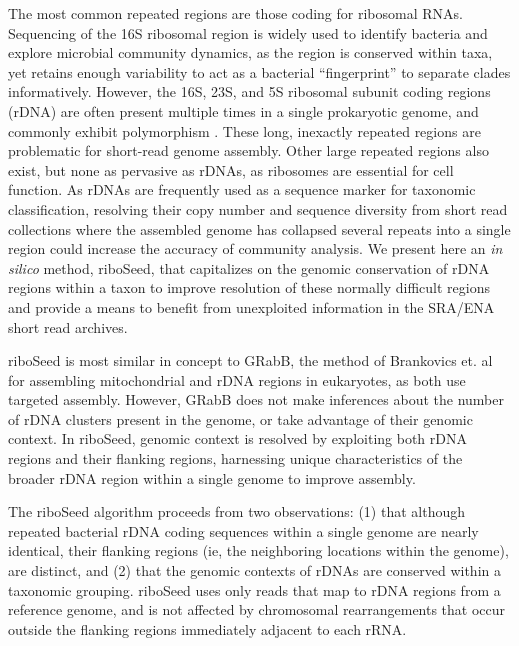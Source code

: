\documentclass[10pt]{article}
\begin{document}
\begin{linenumbers}
The most common repeated regions are those coding for ribosomal RNAs. Sequencing of the 16S ribosomal region is widely used to identify bacteria and explore microbial community dynamics\cite{Weisburg1991,Clarridge2004,Woese1990,Case2007}, as the region is conserved within taxa, yet retains enough variability to act as a bacterial ``fingerprint'' to separate clades informatively. However, the 16S, 23S, and 5S ribosomal subunit coding regions (rDNA) are often present multiple times in a single prokaryotic genome, and commonly exhibit polymorphism \cite{Coenye2003,Moreno2002,Lukjancenko2010,Vetrovsky2013}. These long, inexactly repeated regions\cite{Alkan2011} are problematic for short-read genome assembly. Other large repeated regions also exist, but none as pervasive as rDNAs, as ribosomes are essential for cell function. As rDNAs are frequently used as a sequence marker for taxonomic classification, resolving their copy number and sequence diversity from short read collections where the assembled genome has collapsed several repeats into a single region could increase the accuracy of community analysis. We present here an \textit{in silico} method, riboSeed, that capitalizes on the genomic conservation of rDNA regions within a taxon to improve resolution of these normally difficult regions and provide a means to benefit from unexploited information in the SRA/ENA short read archives.


riboSeed is most similar in concept to GRabB, the method of Brankovics et. al \cite{Brankovics2016} for assembling mitochondrial and rDNA regions in eukaryotes, as both use targeted assembly. However, GRabB does not make inferences about the number of rDNA clusters present in the genome, or take advantage of their genomic context. In riboSeed, genomic context is resolved by exploiting both rDNA regions and their flanking regions, harnessing unique characteristics of the broader rDNA region within a single genome to improve assembly.


The riboSeed algorithm proceeds from two observations: (1) that although repeated bacterial rDNA coding sequences within a single genome are nearly identical, their flanking regions (ie, the neighboring locations within the genome), are distinct, and (2) that the genomic contexts of rDNAs  are conserved within a taxonomic grouping. riboSeed uses only reads that map to rDNA regions from a reference genome, and is not affected by chromosomal rearrangements that occur outside the flanking regions immediately adjacent to each rRNA.



\end{linenumbers}
\end{document}
